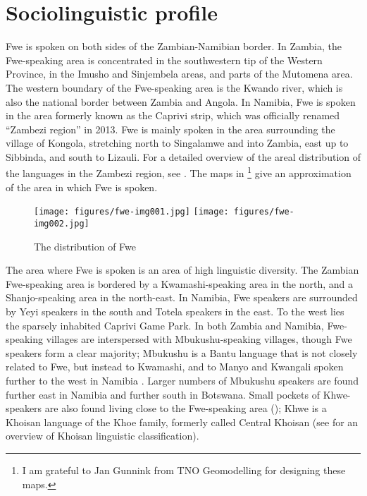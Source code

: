 \section{Sociolinguistic profile}
\label{bkm:Ref450562320}\hypertarget{Toc75352595}{}
Fwe is spoken on both sides of the Zambian-Namibian border. In Zambia, the Fwe-speaking area is concentrated in the southwestern tip of the Western Prov\-ince, in the Imusho and Sinjembela areas, and parts of the Mutomena area. The western boundary of the Fwe-speaking area is the Kwando river, which is also the national border between Zambia and Angola. In Namibia, Fwe is spoken in the area formerly known as the Caprivi strip, which was officially renamed “Zambezi region” in 2013. Fwe is mainly spoken in the area surrounding the village of Kongola, stretching north to Singalamwe and into Zambia, east up to Sibbinda, and south to Lizauli. For a detailed overview of the areal distribution of the languages in the Zambezi region, see {\citet{Seidel2005}}. The maps in \footnote{I am grateful to Jan Gunnink from TNO Geomodelling for designing these maps.} give an approximation of the area in which Fwe is spoken.

\begin{figure} 
\texttt{[image: figures/fwe-img001.jpg]}
\texttt{[image: figures/fwe-img002.jpg]}
\caption{\label{bkm:Ref98513207}The distribution of Fwe}
\end{figure}

The area where Fwe is spoken is an area of high linguistic diversity. The Zambian Fwe-speaking area is bordered by a Kwamashi-speaking area in the north, and a Shanjo-speaking area in the north-east. In Namibia, Fwe speakers are surrounded by Yeyi speakers in the south and Totela speakers in the east. To the west lies the sparsely inhabited Caprivi Game Park. In both Zambia and Namibia, Fwe-speaking villages are interspersed with Mbukushu-speaking villages, though Fwe speakers form a clear majority; Mbukushu is a Bantu language that is not closely related to Fwe, but instead to Kwamashi, and to Manyo and Kwangali spoken further to the west in Namibia \citep{Möhlig1997}. Larger numbers of Mbukushu speakers are found further east in Namibia and further south in Botswana. Small pockets of Khwe-speakers are also found living close to the Fwe-speaking area (\citealt{Brenzinger1998,JonesDieckmann2014}); Khwe is a Khoisan language of the Khoe family, formerly called Central Khoisan (see \citealt{Güldemann2014} for an overview of Khoisan linguistic classification).

